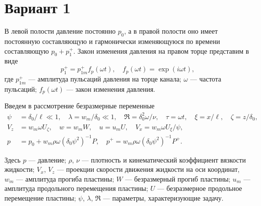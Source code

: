 \documentclass{article}
\begin{document}
\section*{Вариант 1}

В левой полости давление постоянно $p_0$, а в правой полости оно имеет постоянную составляющую и гармонически изменяющуюся по времени составляющую $p_0 + p_1^+$. Закон изменения давления на правом торце представим в виде
\[
p_1^+ = p_{1m}^+ f_p(\omega t), \quad f_p(\omega t) = \exp(i\omega t),
\]
где $p_{1m}^+$ --- амплитуда пульсаций давления на торце канала; $\omega$ --- частота пульсаций; $f_p(\omega t)$ --- закон изменения давления.

Введем в рассмотрение безразмерные переменные
\[
\begin{aligned}
\psi &= \delta_0 / \ell \ll 1, \quad \lambda = w_m / \delta_0 \ll 1, \quad \Re = \delta_0^2 \omega / \nu, \quad \tau = \omega t, \quad \xi = x / \ell, \quad \zeta = z / \delta_0, \\
V_z &= w_m \omega U_\zeta, \quad w = w_m W, \quad u = u_m U, \quad V_x = w_m \omega U_\xi / \psi, \\
p &= p_0 + w_m \rho \omega (\delta_0 \psi^2)^{-1} P, \quad p^+ = w_m \rho \omega (\delta_0 \psi^2)^{-1} P^+.
\end{aligned}
\]

Здесь $p$ --- давление; $\rho$, $\nu$ --- плотность и кинематический коэффициент вязкости жидкости; $V_x$, $V_z$ --- проекции скорости движения жидкости на оси координат, $w_m$ --- амплитуда прогиба пластины; $W$ --- безразмерный прогиб пластины; $u_m$ --- амплитуда продольного перемещения пластины; $U$ --- безразмерное продольное перемещение пластины; $\psi$, $\lambda$, $\Re$ --- параметры, характеризующие задачу.
\end{document}
